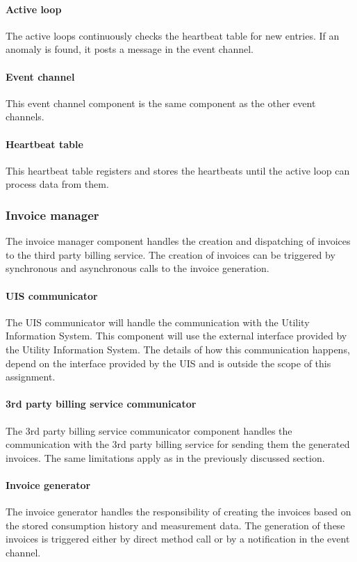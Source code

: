 \paragraph{Active loop} 
The active loops continuously checks the heartbeat table for new entries. If an anomaly is found, 
it posts a message in the event channel.
\paragraph{Event channel} 
This event channel component is the same component as the other event channels.
\paragraph{Heartbeat table} 
This heartbeat table registers and stores the heartbeats until the active loop can process data from them.
\subsubsection{Invoice manager}
The invoice manager component handles the creation and dispatching of invoices to the third party billing service.
The creation of invoices can be triggered by synchronous and asynchronous calls to the invoice generation.
\paragraph{UIS communicator}
The UIS communicator will handle the communication with the Utility Information System. This component will use
the external interface provided by the Utility Information System. The details of how this communication happens, depend on the interface provided by the UIS and is outside the scope of this assignment.
\paragraph{3rd party billing service communicator}
The 3rd party billing service communicator component handles the communication with the 3rd party billing service for sending them the generated invoices. The same limitations apply as in the previously discussed section.
\paragraph{Invoice generator}
The invoice generator handles the responsibility of creating the invoices based on the stored consumption history and measurement data. The generation of these invoices is triggered either by direct method call or by a notification in the event channel.
